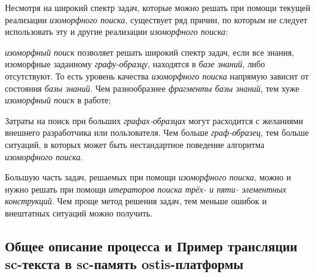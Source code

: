 Несмотря на широкий спектр задач, которые можно решать при помощи текущей реализации \textit{изоморфного поиска}, существует ряд причин, по которым не следует использовать эту и другие реализации \textit{изоморфного поиска}:
\begin{textitemize}
	\item \textit{изоморфный поиск} позволяет решать широкий спектр задач, если все знания, изоморфные заданному \textit{графу-образцу}, находятся в \textit{базе знаний}, либо отсутствуют. То есть уровень качества \textit{изоморфного поиска} напрямую зависит от состояния \textit{базы знаний}. Чем разнообразнее \textit{фрагменты базы знаний}, тем хуже \textit{изоморфный поиск} в работе;
	\item Затраты на поиск при больших \textit{графах-образцах} могут расходится с желаниями внешнего разработчика или пользователя. Чем больше \textit{граф-образец}, тем больше ситуаций, в которых может быть нестандартное поведение алгоритма \textit{изоморфного поиска}.
	\item Большую часть задач, решаемых при помощи \textit{изоморфного поиска}, можно и нужно решать при помощи \textit{итераторов поиска трёх- и пяти- элементных конструкций}. Чем проще метод решения задач, тем меньше ошибок и внештатных ситуаций можно получить.
\end{textitemize}	

\subsection{Общее описание процесса и Пример трансляции sc-текста в sc-память ostis-платформы}
\label{sec_soft_platform_scin_code_example}

